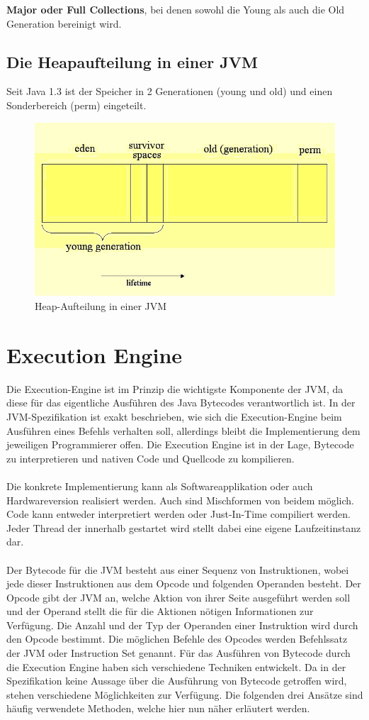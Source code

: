 \documentclass[a4paper,14pt]{scrreprt}
\begin{document}
\textbf{Major oder Full Collections}, bei denen sowohl die Young als auch die Old Generation bereinigt wird. 
\subsection{Die Heapaufteilung in einer JVM}
Seit Java 1.3 ist der Speicher in 2 Generationen (young und old) und einen Sonderbereich (perm) eingeteilt.
\begin{figure}[h!]
\centering
\includegraphics[width=0.8\linewidth]{./imageDD1}
\caption[Heap-Aufteilung in einer JVM]{Heap-Aufteilung in einer JVM}
\label{fig:imageDD1}
\end{figure}
\cite{jvmGarb}
\section{Execution Engine}
Die Execution-Engine ist im Prinzip die wichtigste Komponente der JVM, da diese für das eigentliche Ausführen des Java Bytecodes verantwortlich ist. In der JVM-Spezifikation ist exakt beschrieben, wie sich die Execution-Engine beim Ausführen eines Befehls verhalten soll, allerdings bleibt die Implementierung dem jeweiligen Programmierer offen. Die Execution Engine ist in der Lage, Bytecode zu interpretieren und nativen Code und Quellcode zu kompilieren. \\\\Die konkrete Implementierung kann als Softwareapplikation oder auch Hardwareversion realisiert werden. Auch sind Mischformen von beidem möglich. Code kann entweder interpretiert werden oder Just-In-Time compiliert werden. Jeder Thread der innerhalb gestartet wird stellt dabei eine eigene Laufzeitinstanz dar. \\\\Der Bytecode für die JVM besteht aus einer Sequenz von Instruktionen, wobei jede dieser Instruktionen aus dem Opcode und folgenden Operanden besteht. Der Opcode gibt der JVM an, welche Aktion von ihrer Seite ausgeführt werden soll und der Operand stellt die für die Aktionen nötigen Informationen zur Verfügung. Die Anzahl und der Typ der Operanden einer Instruktion wird durch den Opcode bestimmt. Die möglichen Befehle des Opcodes werden Befehlssatz der JVM oder Instruction Set genannt. Für das Ausführen von Bytecode durch die Execution Engine haben sich verschiedene Techniken entwickelt. Da in der Spezifikation keine Aussage über die Ausführung von Bytecode getroffen wird, stehen verschiedene Möglichkeiten zur Verfügung. Die folgenden drei Ansätze sind häufig verwendete Methoden, welche hier nun näher erläutert werden.
\end{document}
